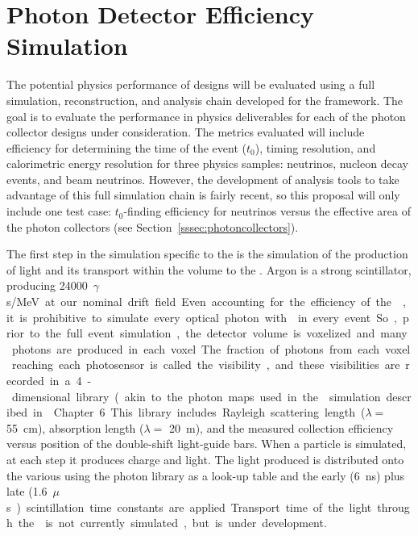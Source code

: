 \section{Photon Detector Efficiency Simulation}
\label{sec:fdsp-pd-simphys}

The potential physics performance of  designs will be evaluated using a full simulation, reconstruction, and analysis chain developed for the \larsoft framework. The goal is to evaluate the performance in physics deliverables for each of the photon collector designs under consideration. The metrics evaluated will include efficiency for determining the time of the event ($t_0$), timing resolution, and calorimetric energy resolution for three physics samples:  neutrinos, nucleon decay events, %
and beam neutrinos. However, the development of analysis tools to take advantage of this full simulation chain is fairly recent, so this proposal will only include one test case: $t_0$-finding efficiency for  neutrinos versus the effective area of the photon collectors (see Section~\ref{sssec:photoncollectors}).

The first step in the simulation specific to the  is the simulation of the production of light and its transport within the volume to the . Argon is a strong scintillator, producing \SI{24000}{$\gamma$s/MeV} at our nominal drift field. Even accounting for the efficiency of the , it is prohibitive to simulate every optical photon with  in every event. So, prior to the full event simulation, the detector volume is voxelized and many photons are produced in each voxel. The fraction of photons from each voxel reaching each photosensor is called the visibility, and these visibilities are recorded in a 4-dimensional library (akin to the photon maps used in the  simulation described in \voltitledpfd~Chapter 6.
This library includes Rayleigh scattering length ($\lambda=$ \SI{55}{cm}\cite{Grace:2015yta}), absorption length ($\lambda=$ \SI{20}{m}), and the measured collection efficiency versus position of the double-shift light-guide bars. When a particle is simulated, at each step it produces charge and light. The light produced is distributed onto the various  using the photon library as a look-up table and the early (\SI{6}{ns}) plus late (\SI{1.6}{$\mu$s}) scintillation time constants are applied. Transport time of the light through the \lar is not currently simulated, but is under development.


